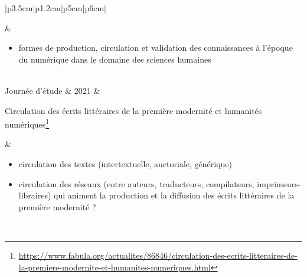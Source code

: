 \begin{table}[htbp]
{\begin{tabular}[t]{|p{3.5cm}|p{1.2cm}|p{5cm}|p{6cm}|}
\begin{minipage}[t]{\linewidth}
			\end{minipage} & 
			\begin{itemize}
				\item formes de production, circulation et validation des connaissances à l’époque du numérique dans le domaine des sciences humaines
			\end{itemize} \\ \hline
			Journée d'étude & 2021 &
			\begin{minipage}[t]{\linewidth}
				\og{}Circulation des écrits littéraires de la première modernité et humanités numériques\fg{}\footnote{\url{https://www.fabula.org/actualites/86846/circulation-des-ecrits-litteraires-de-la-premiere-modernite-et-humanites-numeriques.html}}
			\end{minipage}
			&
			\begin{minipage}[t]{\linewidth}
				\begin{itemize}[leftmargin=*]
					\item circulation des textes (intertextuelle, auctoriale, générique) 
					\item circulation des réseaux (entre auteurs, traducteurs, compilateurs, imprimeurs-libraires) qui animent la production et la diffusion des écrits littéraires de la première modernité ?
				\end{itemize}
			\end{minipage} \\ \hline
		\end{tabular}
	}
	\caption{Évènements scientifiques axés sur la thématique des circulations des savoirs.}
	\label{tab:events}
\end{table}

